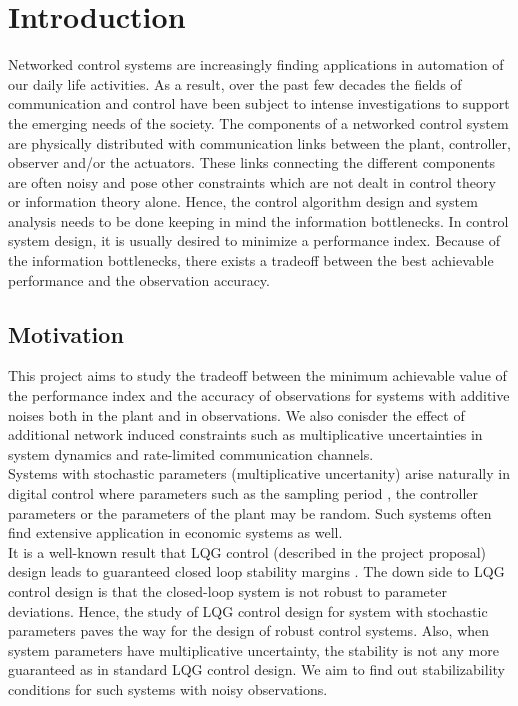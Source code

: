 \documentclass[12pt]{caltech_thesis_progress1}
\begin{document}
\tableofcontents

\mainmatter
\chapter{Introduction}
Networked control systems are increasingly finding applications in automation of our daily life activities. As a result, over the past few decades the fields of communication and control have been subject to intense investigations to support the emerging needs of the society. The components of a networked control system are physically distributed with communication links between the plant, controller, observer and/or the actuators. These links connecting the different components are often noisy and pose other constraints \cite{constraints} which are not dealt in control theory or information theory alone. Hence, the control algorithm design and system analysis needs to be done keeping in mind the information bottlenecks. In control system design, it is usually desired to minimize a performance index. Because of the information bottlenecks, there exists a tradeoff between the best achievable performance and the observation accuracy.  
	\section{Motivation}
This project aims to study the tradeoff between the minimum achievable value of the performance index and the accuracy of observations for systems with additive noises both in the plant and in observations. We also conisder the effect of additional network induced constraints such as multiplicative uncertainties in system dynamics and rate-limited communication channels. \\
Systems with stochastic parameters (multiplicative uncertanity) arise naturally in digital control where parameters such as the sampling period \cite{deko80}, the controller parameters \cite{deko84} or the parameters of the plant \cite{deko89} may be random. Such systems often find extensive application in economic systems as well. \\
It is a well-known result that LQG control (described in the project proposal) design leads to guaranteed closed loop stability margins \cite{doylegua}. The down side to LQG control design is that the closed-loop system is not robust to parameter deviations. Hence, the study of LQG control design for system with stochastic parameters paves the way for the design of robust control systems. Also, when system parameters have multiplicative uncertainty, the stability is not any more guaranteed as in standard LQG control design. We aim to find out stabilizability conditions for such systems with noisy observations. 
\end{document}
